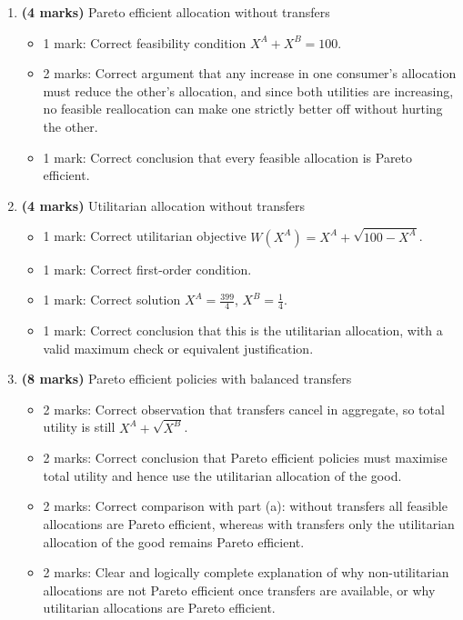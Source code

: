 \documentclass[12pt]{article}
\begin{document}
\begin{enumerate}[label=(\alph*)]
    \item \textbf{(4 marks)} Pareto efficient allocation without transfers
    \begin{itemize}
        \item 1 mark: Correct feasibility condition \(X^A+X^B=100\).
        \item 2 marks: Correct argument that any increase in one consumer's allocation must reduce the other's allocation, and since both utilities are increasing, no feasible reallocation can make one strictly better off without hurting the other.
        \item 1 mark: Correct conclusion that every feasible allocation is Pareto efficient.
    \end{itemize}

    \item \textbf{(4 marks)} Utilitarian allocation without transfers
    \begin{itemize}
        \item 1 mark: Correct utilitarian objective \(W(X^A)=X^A+\sqrt{100-X^A}\).
        \item 1 mark: Correct first-order condition.
        \item 1 mark: Correct solution \(X^A=\frac{399}{4}\), \(X^B=\frac14\).
        \item 1 mark: Correct conclusion that this is the utilitarian allocation, with a valid maximum check or equivalent justification.
    \end{itemize}

    \item \textbf{(8 marks)} Pareto efficient policies with balanced transfers
    \begin{itemize}
        \item 2 marks: Correct observation that transfers cancel in aggregate, so total utility is still \(X^A+\sqrt{X^B}\).
        \item 2 marks: Correct conclusion that Pareto efficient policies must maximise total utility and hence use the utilitarian allocation of the good.
        \item 2 marks: Correct comparison with part (a): without transfers all feasible allocations are Pareto efficient, whereas with transfers only the utilitarian allocation of the good remains Pareto efficient.
        \item 2 marks: Clear and logically complete explanation of why non-utilitarian allocations are not Pareto efficient once transfers are available, or why utilitarian allocations are Pareto efficient.
    \end{itemize}


\end{enumerate}
\end{document}
